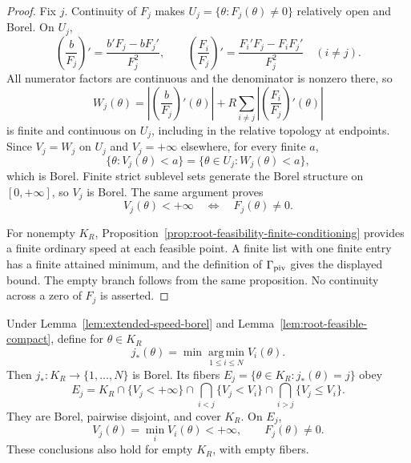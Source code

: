 \begin{proof}
Fix $j$.  Continuity of $F_j$ makes
$U_j=\{\theta:F_j(\theta)\neq0\}$ relatively open and Borel.  On $U_j$,
\[
\left(\frac b{F_j}\right)'=\frac{b'F_j-bF_j'}{F_j^2},
\qquad
\left(\frac{F_i}{F_j}\right)'=
\frac{F_i'F_j-F_iF_j'}{F_j^2}\quad(i\neq j).
\]
All numerator factors are continuous and the denominator is nonzero there,
so
\[
W_j(\theta)=
\left|\left(\frac b{F_j}\right)'(\theta)\right|
 +R\sum_{i\neq j}\left|\left(\frac{F_i}{F_j}\right)'(\theta)\right|
\]
is finite and continuous on $U_j$, including in the relative topology at
endpoints.  Since $V_j=W_j$ on $U_j$ and $V_j=+\infty$ elsewhere, for every
finite $a$,
\[
\{\theta:V_j(\theta)<a\}=\{\theta\in U_j:W_j(\theta)<a\},
\]
which is Borel.  Finite strict sublevel sets generate the Borel structure on
$[0,+\infty]$, so $V_j$ is Borel.  The same argument proves
\[
V_j(\theta)<+\infty\quad\Longleftrightarrow\quad F_j(\theta)\neq0.
\]

For nonempty $K_R$, Proposition~\ref{prop:root-feasibility-finite-conditioning}
provides a finite ordinary speed at each feasible point.  A finite list with
one finite entry has a finite attained minimum, and the definition of
$\Gamma_{\rm piv}$ gives the displayed bound.  The empty branch follows
from the same proposition.  No continuity across a zero of $F_j$ is
asserted.
\end{proof}

\begin{proposition}
\label{prop:lexicographic-pivot-partition}
Under Lemma~\ref{lem:extended-speed-borel} and
Lemma~\ref{lem:root-feasible-compact}, define for $\theta\in K_R$
\[
j_*(\theta)=\min\operatorname*{arg\,min}_{1\leq i\leq N}V_i(\theta).
\]
Then $j_*:K_R\to\{1,\ldots,N\}$ is Borel.  Its fibers
$E_j=\{\theta\in K_R:j_*(\theta)=j\}$ obey
\[
E_j=K_R\cap\{V_j<+\infty\}
\cap\bigcap_{i<j}\{V_j<V_i\}
\cap\bigcap_{i>j}\{V_j\leq V_i\}.
\tag{A1}
\]
They are Borel, pairwise disjoint, and cover $K_R$.  On $E_j$,
\[
V_j(\theta)=\min_iV_i(\theta)<+\infty,
\qquad F_j(\theta)\neq0.
\]
These conclusions also hold for empty $K_R$, with empty fibers.
\end{proposition}

